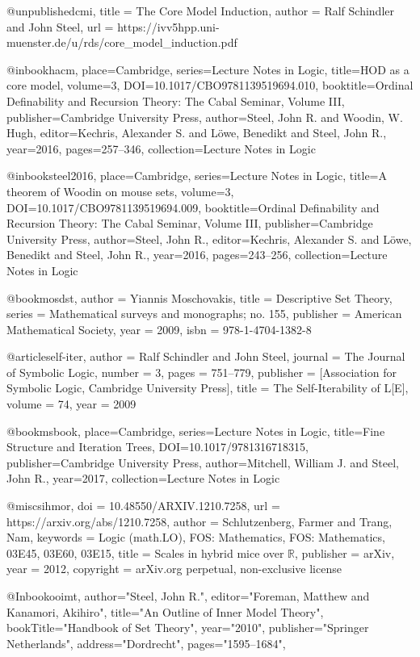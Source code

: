 @unpublished{cmi,
title = {The Core Model Induction},
author = {Ralf Schindler and John Steel},
url = {https://ivv5hpp.uni-muenster.de/u/rds/core_model_induction.pdf}
}

@inbook{hacm, place={Cambridge}, series={Lecture Notes in Logic}, title={HOD as a core model}, volume={3}, DOI={10.1017/CBO9781139519694.010}, booktitle={Ordinal Definability and Recursion Theory: The Cabal Seminar, Volume III}, publisher={Cambridge University Press}, author={Steel, John R. and Woodin, W. Hugh}, editor={Kechris, Alexander S. and Löwe, Benedikt and Steel, John R.}, year={2016}, pages={257–346}, collection={Lecture Notes in Logic}}

@inbook{steel2016, place={Cambridge}, series={Lecture Notes in Logic}, title={A theorem of Woodin on mouse sets}, volume={3}, DOI={10.1017/CBO9781139519694.009}, booktitle={Ordinal Definability and Recursion Theory: The Cabal Seminar, Volume III}, publisher={Cambridge University Press}, author={Steel, John R.}, editor={Kechris, Alexander S. and Löwe, Benedikt and Steel, John R.}, year={2016}, pages={243–256}, collection={Lecture Notes in Logic}}

@book{mosdst,
author = {Yiannis Moschovakis},
title = {Descriptive Set Theory},
series = {Mathematical surveys and monographs; no. 155},
publisher = {American Mathematical Society},
year = {2009},
isbn = {978-1-4704-1382-8}}

@article{self-iter,
 author = {Ralf Schindler and John Steel},
 journal = {The Journal of Symbolic Logic},
 number = {3},
 pages = {751--779},
 publisher = {[Association for Symbolic Logic, Cambridge University Press]},
 title = {The Self-Iterability of L[E]},
 volume = {74},
 year = {2009}
}

@book{msbook, place={Cambridge}, series={Lecture Notes in Logic}, title={Fine Structure and Iteration Trees}, DOI={10.1017/9781316718315}, publisher={Cambridge University Press}, author={Mitchell, William J. and Steel, John R.}, year={2017}, collection={Lecture Notes in Logic}}

@misc{sihmor,
  doi = {10.48550/ARXIV.1210.7258},
  url = {https://arxiv.org/abs/1210.7258},
  author = {Schlutzenberg, Farmer and Trang, Nam},
  keywords = {Logic (math.LO), FOS: Mathematics, FOS: Mathematics, 03E45, 03E60, 03E15},
  title = {Scales in hybrid mice over $\mathbb{R}$},
  publisher = {arXiv},
  year = {2012},
  copyright = {arXiv.org perpetual, non-exclusive license}
}

@Inbook{ooimt,
author="Steel, John R.",
editor="Foreman, Matthew
and Kanamori, Akihiro",
title="An Outline of Inner Model Theory",
bookTitle="Handbook of Set Theory",
year="2010",
publisher="Springer Netherlands",
address="Dordrecht",
pages="1595--1684",
}

